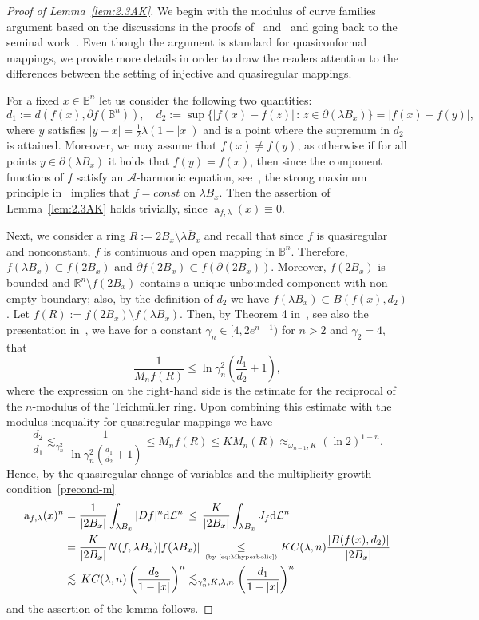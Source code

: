 \documentclass[11pt,a4paper,reqno]{amsart}
\theoremstyle{definition}
\renewcommand{\a}{\operatorname{a}}
\newcommand{\om}{\omega}
\newcommand{\B}{\mathbb{B}^n}
\newcommand{\Rn}{{\mathbb R}^n}
\newcommand{\Leb}{\mathrm {d}{\mathcal L}^{n}}
\numberwithin{komcounter}{section}
\begin{document}
\begin{proof}[Proof of Lemma~\ref{lem:2.3AK}] 
We begin with the modulus of curve families argument based on the discussions in the proofs of~\cite[Theorem 1.8]{asge1} and~\cite[Theorem 5.3]{no} and going back to the seminal work~\cite{ge}. Even though the argument is standard for quasiconformal mappings, we provide more details in order to draw the readers attention to the differences between the setting of injective and quasiregular mappings.

For a fixed $x\in \B$ let us consider the following two quantities:
$$
d_1:=d(f(x),\partial f(\B)),\quad d_2 := \sup \{|f(x)-f(z)|\,:\,z\in\partial (\lambda B_x)\}=|f(x)-f(y)|,
$$
where $y$ satisfies $|y-x|=\frac12 \lambda (1-|x|)$ and is a point where the supremum in $d_2$ is attained. Moreover, we may assume that $f(x)\not=f(y)$, as otherwise if for all points $y\in \partial(\lambda B_x)$ it holds that $f(y)=f(x)$, then since the component functions of $f$ satisfy an $\mathcal{A}$-harmonic equation, see~\cite[Theorem 14.42]{hkm}, the strong maximum principle in~\cite[Thorem 6.5]{hkm} implies that $f=const$ on $\lambda B_x$. Then the assertion of Lemma~\ref{lem:2.3AK} holds trivially, since $\a_{f,\lambda}(x)\equiv 0$. 

Next, we consider a ring $R:=2B_x\setminus \overline{\lambda B_x}$ and recall that since $f$ is quasiregular and nonconstant, $f$ is continuous and open mapping in $\B$. Therefore, $f(\lambda B_x)\subset f(2B_x)$ and $\partial f(2B_x)\subset f(\partial( 2B_x))$. Moreover, $f(2B_x)$ is bounded and $\Rn\setminus f(2B_x)$ contains a unique unbounded component with non-empty boundary; also, by the definition of $d_2$ we have $f(\lambda B_x)\subset B(f(x),d_2)$. Let $f(R):=f(2B_x)\setminus \overline{f(\lambda B_x)}$. Then, by Theorem 4 in~\cite{ge}, see also the presentation in~\cite[Chapter 7]{vuo2}, we have for a constant $\gamma_n \in [4, 2e^{n-1})$ for $n>2$ and $\gamma_2=4$, that  
\[
 \frac{1}{M_n f(R)} \leq \ln \gamma_n^2\left(\frac{d_1}{d_2}+1\right),
\]
where the expression on the right-hand side is the estimate for the reciprocal of the $n$-modulus of the Teichm\"uller ring.
Upon combining this estimate with the modulus inequality for quasiregular mappings we have
\[ 
\frac{d_2}{d_1}\lesssim_{\gamma_n^2} \frac{1}{\ln \gamma_n^2\left(\frac{d_1}{d_2}+1\right)}\leq M_n f(R) \leq K M_n(R)   \approx_{\om_{n-1}, K} (\ln 2)^{1-n}.
\]
Hence, by the quasiregular change of variables and the multiplicity growth condition~\eqref{precond-m}
\begin{align*}
  \a_{f,\lambda }(x)^n &= \frac{1}{|2B_x|}\int_{\lambda B_x}|Df|^n \Leb\,
   \leq\, \frac{K}{|2B_x|}\int_{\lambda B_x}J_f \Leb	\\
	&=\frac{K}{|2B_x|}N(f,\lambda B_x)|f(\lambda B_x)|\,\underset{\hbox{\tiny{(by~\eqref{eq:Mhyperbolic})}}}{\leq}
	KC(\lambda, n)  \frac{|B(f(x), d_2)|}{|2B_x|} \\
	&\lesssim\, KC(\lambda, n) \left(\frac{d_2}{1-|x|}\right)^n \lesssim_{\gamma_n^2, K,\lambda, n} \left( \frac{d_1}{1-|x|}\right)^n
\end{align*}
and the assertion of the lemma follows.
\end{proof}
\end{document}

